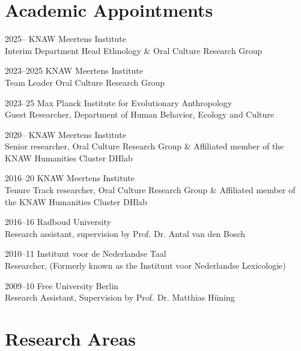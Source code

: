 \documentclass[12pt,letterpaper]{report}
\begin{document}
\section*{Academic Appointments}
\begin{tablist}
\item[2025--]   \tab{}KNAW Meertens Institute \\
  Interim Department Head Ethnology & Oral Culture Research Group
\item[2023--2025]   \tab{}KNAW Meertens Institute \\
  Team Leader Oral Culture Research Group
\item[2023--25]   \tab{}Max Planck Institute for Evolutionary Anthropology \\
  Guest Researcher, Department of Human Behavior, Ecology and Culture
\item[2020--]   \tab{}KNAW Meertens Institute \\
  Senior researcher, Oral Culture Research Group \& Affiliated member of the KNAW Humanities
  Cluster DHlab

\item[2016--20] \tab{}KNAW Meertens Institute \\
  Tenure Track researcher, Oral Culture Research Group \& Affiliated member of the KNAW
  Humanities Cluster DHlab

\item[2016--16] \tab{}Radboud University \\
  Research assistant, supervision by Prof. Dr. Antal van den Bosch

\item[2010--11] \tab{}Instituut voor de Nederlandse Taal \\
  Researcher, (Formerly known as the Instituut voor Nederlandse Lexicologie)

\item[2009--10] \tab{}Free University Berlin \\
  Research Assistant, Supervision by Prof. Dr. Matthias Hüning
\end{tablist}

\section*{Research Areas}
\end{document}
